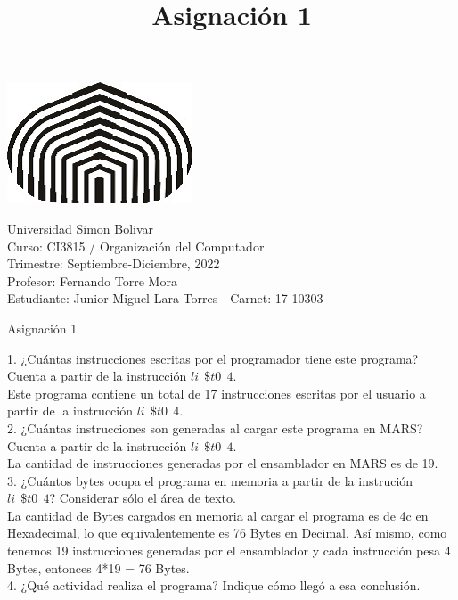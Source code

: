 \documentclass[a4paper,12pt]{article}
\title{Asignación 1}
\begin{document}
\begin{center}
\par \includegraphics[scale=1]{USB} \par
Universidad Simon Bolivar \\ Curso: CI3815 / Organización del Computador \\ Trimestre: Septiembre-Diciembre, 2022 \\ Profesor: Fernando Torre Mora \\ Estudiante: Junior Miguel Lara Torres - Carnet: 17-10303 \\
\end{center}

\begin{center}
Asignación 1
\end{center}

1. ¿Cuántas instrucciones escritas por el programador tiene este programa? Cuenta a partir de la instrucción $ li~~\$t0~~4 $. \\

Este programa contiene un total de 17 instrucciones escritas por el usuario a partir de la instrucción $ li~~\$t0~~4 $. \\

2. ¿Cuántas instrucciones son generadas al cargar este programa en MARS? Cuenta a partir de la instrucción $ li~~\$t0~~4 $. \\

La cantidad de instrucciones generadas por el ensamblador en MARS es de 19. \\

3. ¿Cuántos bytes ocupa el programa en memoria a partir de la instrución $ li~~\$t0~~4 $? Considerar sólo el área de texto. \\

La cantidad de Bytes cargados en memoria al cargar el programa es de 4c en Hexadecimal, lo que equivalentemente es 76 Bytes en Decimal. Así mismo, como tenemos 19 instrucciones generadas por el ensamblador y cada instrucción pesa 4 Bytes, entonces 4*19 = 76 Bytes.\\

4. ¿Qué actividad realiza el programa? Indique cómo llegó a esa conclusión. \\
\end{document}
